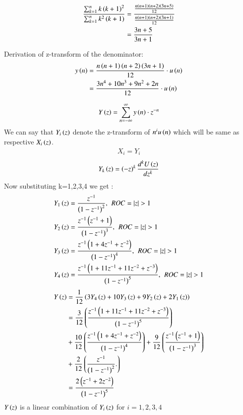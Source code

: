 \documentclass[journal,12pt,twocolumn]{IEEEtran}
\theoremstyle{remark}
\begin{document}
\begin{enumerate}
\begin{align}
     \dfrac{ \sum_{k=1}^n k\left(k+1\right)^2 }{\sum_{k=1}^n k^2\left(k+1\right)} &= \dfrac{\frac{n\left(n+1\right)\left(n+2\right)\left(3n+5\right)}{12}}{\frac{n\left(n+1\right)\left(n+2\right)\left(3n+1\right)}{12}}\\
                                                            &= \frac{3n+5}{3n+1}
\end{align}

Derivation of z-transform of the denominator:
\begin{align}
    y\left(n\right) &= \frac{n\left(n+1\right)\left(n+2\right)\left(3n+1\right)}{12}\cdot u\left(n\right)\\
         &= \frac{3n^4 + 10n^3 + 9n^2 + 2n}{12}\cdot u\left(n\right)\
\end{align}

\begin{equation}
    Y\left(z\right) = \sum_{n=-\infty}^\infty y\left(n\right)\cdot z^{-n}
\end{equation}
We can say that $Y_i\left(z\right)$ denote the z-transform of $n^{i}u\left(n\right)$ which will be same as respective $X_i\left(z\right)$.
\begin{align}\label{eq:61}
    X_i=Y_i
\end{align}
\begin{align} \label{eq:24}
    Y_k\left(z\right) =  \left(-z\right)^k \frac{d^kU\left(z\right)}{dz^k}
\end{align}
Now substituting k=1,2,3,4 we get :
\begin{align}
    Y_1\brak{z} &= \frac{z^{-1}}{\brak{1-z^{-1}}^2} , \hspace{4pt} ROC=|z|>1\\
    Y_2\brak{z} &= \frac{z^{-1}\brak{z^{-1}+1}}{\brak{1-z^{-1}}^3} , \hspace{4pt} ROC=|z|>1\\
    Y_3\brak{z} &= \frac{z^{-1}\brak{1+4z^{-1}+z^{-2}}}{\brak{1-z^{-1}}^4}, \hspace{4pt} ROC=|z|>1\\
    Y_4\brak{z} &= \frac{z^{-1}\brak{1+11z^{-1}+11z^{-2}+z^{-3}}}{\brak{1-z^{-1}}^5}, \hspace{4pt} ROC=|z|>1
\end{align}
\begin{align}
    Y\left(z\right) &=\frac{1}{12}\left(3Y_4\left(z\right) + 10Y_3\left(z\right) + 9Y_2\left(z\right) + 2Y_1\left(z\right)\right) \\
         &= \frac{3}{12}\left(\frac{z^{-1}\left(1+11z^{-1}+11z^{-2}+z^{-3}\right)}{\left(1-z^{-1}\right)^5}\right)\\ &+ \frac{10}{12}\left(\frac{z^{-1}\left(1+4z^{-1}+z^{-2}\right)}{\left(1-z^{-1}\right)^4}\right) 
         + \frac{9}{12}\left(\frac{z^{-1}\left(z^{-1}+1\right)}{\left(1-z^{-1}\right)^3}\right)\notag \\ &+ \frac{2}{12}\left(\frac{z^{-1}}{\left(1-z^{-1}\right)^2}.\right)\notag \\
         &= \frac{2\left(z^{-1}+2z^{-2}\right)}{\left(1-z^{-1}\right)^5}
\end{align}
$Y\left(z\right)$ is a linear combination of $Y_i\left(z\right)$ for $i=1,2,3,4$


\end{enumerate}
\end{document}
